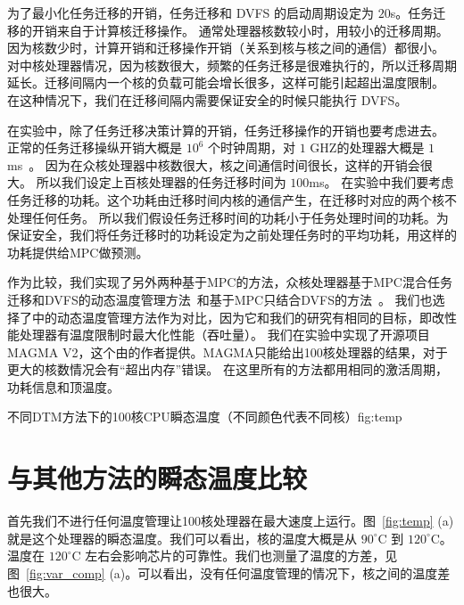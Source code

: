为了最小化任务迁移的开销，任务迁移和 DVFS 的启动周期设定为 $20$s。任务迁移的开销来自于计算核迁移操作。
通常处理器核数较小时，用较小的迁移周期。因为核数少时，计算开销和迁移操作开销（关系到核与核之间的通信）都很小。
对中核处理器情况，因为核数很大，频繁的任务迁移是很难执行的，所以迁移周期延长。迁移间隔内一个核的负载可能会增长很多，这样可能引起超出温度限制。
在这种情况下，我们在迁移间隔内需要保证安全的时候只能执行 DVFS。

在实验中，除了任务迁移决策计算的开销，任务迁移操作的开销也要考虑进去。
正常的任务迁移操纵开销大概是 $10^6$ 个时钟周期，对 $1$ GHZ的处理器大概是 $1$ms~\cite{Cuesta:ISVLSI'10}。
因为在众核处理器中核数很大，核之间通信时间很长，这样的开销会很大。
所以我们设定上百核处理器的任务迁移时间为 $100$ms。
在实验中我们要考虑任务迁移的功耗。这个功耗由迁移时间内核的通信产生，在迁移时对应的两个核不处理任何任务。
所以我们假设任务迁移时间的功耗小于任务处理时间的功耗。为保证安全，我们将任务迁移时的功耗设定为之前处理任务时的平均功耗，用这样的功耗提供给MPC做预测。

作为比较，我们实现了另外两种基于MPC的方法，众核处理器基于MPC混合任务迁移和DVFS的动态温度管理方法~\cite{MaWang:APCCAS'14}和基于MPC只结合DVFS的方法~\cite{Zanini:ECCTD'09}。
我们也选择了\cite{Hanumaiah:TCAD'11}中的动态温度管理方法作为对比，因为它和我们的研究有相同的目标，即改性能处理器有温度限制时最大化性能（吞吐量）。
我们在实验中实现了开源项目 MAGMA V2，这个由\cite{Hanumaiah:TCAD'11}的作者提供。MAGMA只能给出100核处理器的结果，对于更大的核数情况会有“超出内存”错误。
在这里所有的方法都用相同的激活周期，功耗信息和顶温度。

\begin{pics}{不同DTM方法下的100核CPU瞬态温度（不同颜色代表不同核）}{fig:temp}
 \end{pics}
 
\section{与其他方法的瞬态温度比较}\label{sec:temp_comp}
首先我们不进行任何温度管理让100核处理器在最大速度上运行。图~\ref{fig:temp} (a)就是这个处理器的瞬态温度。我们可以看出，核的温度大概是从 $90^{\circ}$C
到 $120^{\circ}$C。温度在 $120^{\circ}$C 左右会影响芯片的可靠性。我们也测量了温度的方差，见图~\ref{fig:var_comp} (a)。可以看出，没有任何温度管理的情况下，核之间的温度差也很大。



